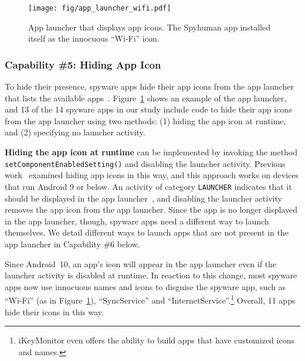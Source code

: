 \begin{figure}[t]
\centering
\texttt{[image: fig/app\_launcher\_wifi.pdf]}
\caption[App Launcher Example]{App launcher that displays app icons.
The Spyhuman app installed itself as the innocuous ``Wi-Fi'' icon.}
\label{fig:app_launcher}
\end{figure}

\subsubsection*{Capability \#5: Hiding App Icon}
\label{subsubsec:hide_icon}
To hide their presence,
spyware apps hide their app icons from the app launcher that lists the available
apps~\cite{whataret1:online}. Figure~\ref{fig:app_launcher} shows an example of
the app launcher, and 13 of the 14 spyware apps in our study include code to hide their
app icons from the app launcher using two methods:
(1) hiding the app icon at runtime, and (2) specifying no launcher activity.

\textbf{Hiding the app icon at runtime} can be implemented by invoking
the method \texttt{setComponentEnabledSetting()} and disabling the
launcher activity.  Previous work~\cite{shan2018self} examined hiding
app icons in this way, and this approach works on devices that run
Android 9 or below. An activity of category \texttt{LAUNCHER}
indicates that it should be displayed in the app
launcher~\cite{IntentAn33:online}, and disabling the launcher activity
removes the app icon from the app launcher.  Since the app is no
longer displayed in the app launcher, though, spyware apps need a
different way to launch themselves. We detail different ways to launch
apps that are not present in the app launcher in Capability \#6 below.

Since Android~10, an app's icon will appear in the app launcher even
if the launcher activity is disabled at runtime. In reaction to this
change, most spyware apps now use innocuous names and icons to
disguise the spyware app, such as ``Wi-Fi'' (as in Figure~\ref{fig:app_launcher}), ``SyncService'' and
``InternetService''.\footnote{iKeyMonitor even offers the ability to
  build apps that have customized icons and names.} Overall, 11 apps hide their icons in this way.


